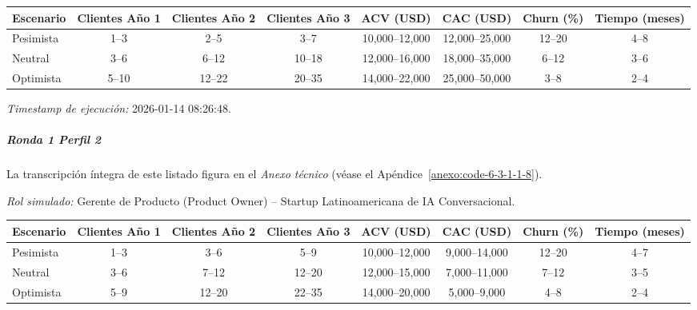 \begin{center}
\footnotesize
\begin{adjustbox}{max width=\textwidth}
\begin{tabular}{|l|c|c|c|c|c|c|c|}
\hline
\textbf{Escenario} & \textbf{Clientes Año 1} & \textbf{Clientes Año 2} & \textbf{Clientes Año 3} & \textbf{ACV (USD)} & \textbf{CAC (USD)} & \textbf{Churn (\%)} & \textbf{Tiempo (meses)} \\
\hline
Pesimista & 1--3 & 2--5 & 3--7 & 10,000--12,000 & 12,000--25,000 & 12--20 & 4--8 \\
\hline
Neutral & 3--6 & 6--12 & 10--18 & 12,000--16,000 & 18,000--35,000 & 6--12 & 3--6 \\
\hline
Optimista & 5--10 & 12--22 & 20--35 & 14,000--22,000 & 25,000--50,000 & 3--8 & 2--4 \\
\hline
\end{tabular}
\end{adjustbox}
\end{center}

\textit{Timestamp de ejecución:} 2026-01-14 08:26:48.

\subparagraph{Ronda 1 Perfil 2}

La transcripción íntegra de este listado figura en el \textit{Anexo técnico} (véase el Apéndice~\ref{anexo:code-6-3-1-1-8}).

\textit{Rol simulado:} Gerente de Producto (Product Owner) – Startup Latinoamericana de IA Conversacional.

\begin{center}
\footnotesize
\begin{adjustbox}{max width=\textwidth}
\begin{tabular}{|l|c|c|c|c|c|c|c|}
\hline
\textbf{Escenario} & \textbf{Clientes Año 1} & \textbf{Clientes Año 2} & \textbf{Clientes Año 3} & \textbf{ACV (USD)} & \textbf{CAC (USD)} & \textbf{Churn (\%)} & \textbf{Tiempo (meses)} \\
\hline
Pesimista & 1--3 & 3--6 & 5--9 & 10,000--12,000 & 9,000--14,000 & 12--20 & 4--7 \\
\hline
Neutral & 3--6 & 7--12 & 12--20 & 12,000--15,000 & 7,000--11,000 & 7--12 & 3--5 \\
\hline
Optimista & 5--9 & 12--20 & 22--35 & 14,000--20,000 & 5,000--9,000 & 4--8 & 2--4 \\
\hline
\end{tabular}
\end{adjustbox}
\end{center}

